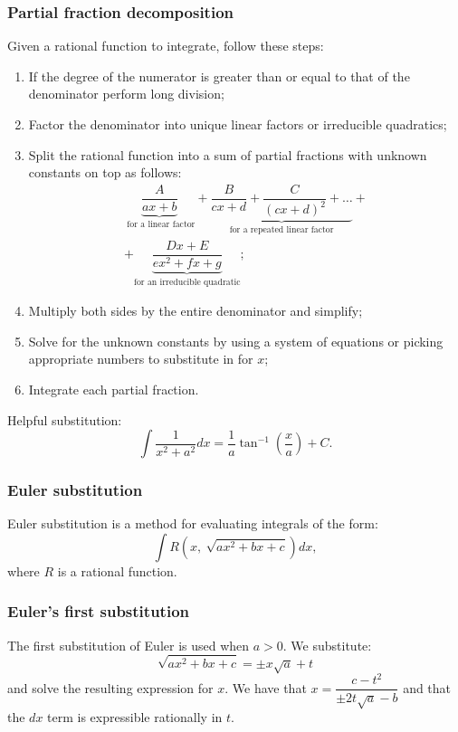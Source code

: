 \subsubsection*{Partial fraction decomposition}
\par
Given a rational function to integrate, follow these steps:
\begin{enumerate}
    \item If the degree of the numerator is greater than or equal to that of the denominator perform long division;
    \item Factor the denominator into unique linear factors or irreducible quadratics;
    \item Split the rational function into a sum of partial fractions with unknown constants on top as follows:
    \[
        \begin{array}{c}
            \underbrace{\dfrac{A}{ax+b}}_{\text{ for a linear factor}} + \underbrace{\dfrac{B}{cx+d} + \dfrac{C}{\left(cx + d\right)^2} + \ldots}_{\text{for a repeated linear factor}} + \\[1cm] + \underbrace{\dfrac{Dx + E}{ex^2 + fx + g}}_{\text{for an irreducible quadratic}}; 
        \end{array}
    \] 
    \item Multiply both sides by the entire denominator and simplify;
    \item Solve for the unknown constants by using a system of equations or picking appropriate numbers to substitute in for $x$;
    \item Integrate each partial fraction.
\end{enumerate}
\begin{note}{}{}
    Helpful substitution:
    \useshortskip
    \[
        \int \dfrac{1}{x^2 + a^2} dx = \dfrac{1}{a}\tan^{-1} \left(\dfrac{x}{a} \right) + C.  
    \]
\end{note}
\subsubsection*{Euler substitution}
\par 
Euler substitution is a method for evaluating integrals of the form:
\[
    \int R(x, \ \sqrt{ax^2 + bx +c})dx,  
\]
where $R$ is a rational function.

\subsubsection*{Euler's  first substitution}
\par 
The first substitution of Euler is used when $a> 0$. We substitute:
\[
    \sqrt{ax^2+bx+c} = \pm x \sqrt{a} + t  
\]
and solve the resulting expression for $x$. We have that $x = \dfrac{c-t^2}{\pm 2t\sqrt{a} - b}$ and that the $dx$ term is expressible rationally in $t$.

